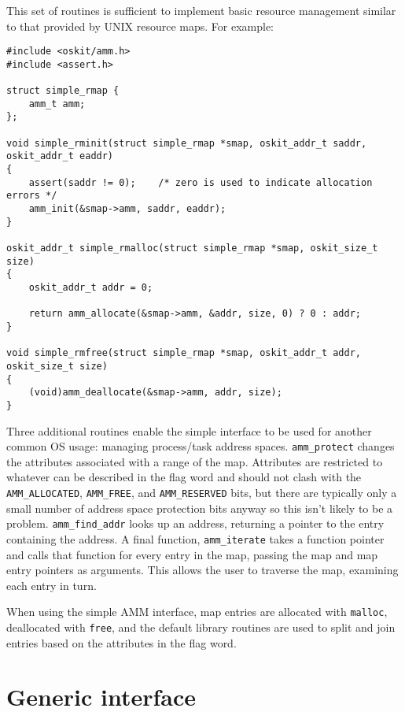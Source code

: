 This set of routines is sufficient to implement basic resource management
similar to that provided by UNIX resource maps.
For example:
\begin{codefrag}
\footnotesize
\begin{verbatim}
#include <oskit/amm.h>
#include <assert.h>

struct simple_rmap {
    amm_t amm;
};

void simple_rminit(struct simple_rmap *smap, oskit_addr_t saddr, oskit_addr_t eaddr)
{
    assert(saddr != 0);    /* zero is used to indicate allocation errors */
    amm_init(&smap->amm, saddr, eaddr);
}

oskit_addr_t simple_rmalloc(struct simple_rmap *smap, oskit_size_t size)
{
    oskit_addr_t addr = 0;

    return amm_allocate(&smap->amm, &addr, size, 0) ? 0 : addr;
}

void simple_rmfree(struct simple_rmap *smap, oskit_addr_t addr, oskit_size_t size)
{
    (void)amm_deallocate(&smap->amm, addr, size);
}
\end{verbatim}
\end{codefrag}

Three additional routines enable the simple interface to be used for another
common OS usage: managing process/task address spaces.
{\tt amm_protect} changes the attributes associated with a range of the map.
Attributes are restricted to whatever can be described in the flag word and
should not clash with the {\tt AMM_ALLOCATED}, {\tt AMM_FREE},
and {\tt AMM_RESERVED} bits,
but there are typically only a small number of address space protection bits
anyway so this isn't likely to be a problem.
{\tt amm_find_addr} looks up an address, returning a pointer to the entry
containing the address.
A final function,
{\tt amm_iterate} takes a function pointer and calls that function for every
entry in the map, passing the map and map entry pointers as arguments.
This allows the user to traverse the map, examining each entry in turn.

When using the simple AMM interface,
map entries are allocated with {\tt malloc}, deallocated with {\tt free},
and the default library routines are used to split and join entries based
on the attributes in the flag word.

\section{Generic interface}
\label{amm-generic-if}

